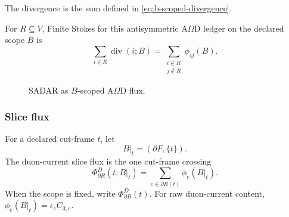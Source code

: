 The divergence is the sum defined in \eqref{eq:b-scoped-divergence}.

For \(R\subseteq V\), Finite Stokes for this antisymmetric A\(\Omega\)D ledger on the declared scope \(B\) is
\begin{equation}
\sum_{i\in R}\operatorname{div}(i;B)
=
\sum_{\substack{i\in R\\j\notin R}}\phi_{ij}(B).
\label{eq:b-scoped-stokes}
\end{equation}
\begin{figure}[H]
\centering
{}
\caption{SADAR as \(B\)-scoped A\(\Omega\)D flux.}
\label{fig:sadar-b-scoped-afc-flux}
\end{figure}


\subsubsection{Slice flux}
\label{subsec:slice-flux}
\begin{definition}
For a declared cut-frame \(t\), let
\[
B|_t=(\partial F,\{t\}).
\]
The duon-current slice flux is the one cut-frame crossing
\begin{equation}
\Phi^D_{\partial R}(t;B|_t)
=
\sum_{e\in\partial R(t)}
\phi_e(B|_t).
\label{eq:slice-flux}
\end{equation}
When the scope is fixed, write \(\Phi^D_{\partial R}(t)\). For raw duon-current content, \(\phi_e(B|_t)=\epsilon_e C_{3,e}\).
\end{definition}

